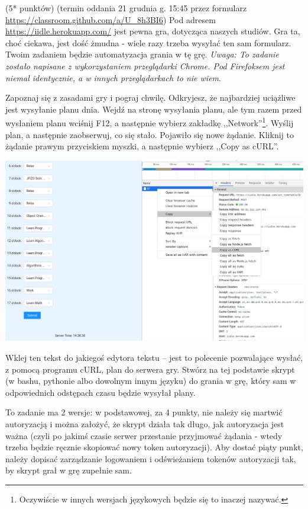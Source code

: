 \begin{zadanie} (5* punktów) (termin oddania 21 grudnia g. 15:45 przez formularz \url{https://classroom.github.com/a/U_8h3BI6})
Pod adresem \url{https://iidle.herokuapp.com/} jest pewna gra, dotycząca naszych studiów. Gra ta, choć ciekawa, jest dość żmudna - wiele razy trzeba wysyłać ten sam formularz. Twoim zadaniem będzie automatyzacja grania w tę grę. \emph{Uwaga: To zadanie zostało napisane z wykorzystaniem przeglądarki Chrome. Pod Firefoksem jest niemal identycznie, a w innych przeglądarkach to nie wiem}.

Zapoznaj się z zasadami gry i pograj chwilę. Odkryjesz, że najbardziej uciążliwe jest wysyłanie planu dnia. Wejdź na stronę wysyłania planu, ale tym razem przed wysłaniem planu wciśnij F12, a następnie wybierz zakładkę ,,Network''\footnote{Oczywiście w innych wersjach językowych będzie się to inaczej nazywać.}. Wyślij plan, a następnie zaobserwuj, co się stało. Pojawiło się nowe żądanie. Kliknij to żądanie prawym przyciskiem myszki, a następnie wybierz ,,Copy as cURL''.  

\includegraphics[scale=1.3]{iidle.png}

Wklej ten tekst do jakiegoś edytora tekstu -- jest to polecenie pozwalające wysłać, z pomocą programu cURL, plan do serwera gry. Stwórz na tej podstawie skrypt (w bashu, pythonie albo dowolnym innym języku) do grania w grę, który sam w odpowiednich odstępach czasu będzie wysyłał plany. 

To zadanie ma 2 wersje: w podstawowej, za 4 punkty, nie należy się martwić autoryzacją i można założyć, że skrypt działa tak długo, jak autoryzacja jest ważna (czyli po jakimś czasie serwer przestanie przyjmować żądania - wtedy trzeba będzie ręcznie skopiować nowy token autoryzacji). Aby dostać piąty punkt, należy dopisać zarządzanie logowaniem i odświeżaniem tokenów autoryzacji tak, by skrypt grał w grę zupełnie sam.
\end{zadanie}




